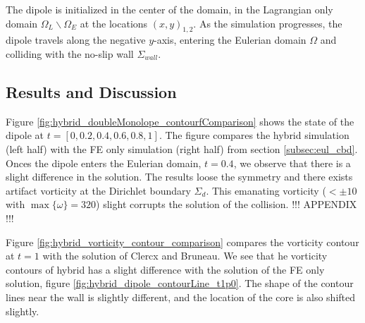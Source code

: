 The dipole is initialized in the center of the domain, in the Lagrangian only domain $\Omega_L\backslash\Omega_E$ at the locations $(x,y)_{1,2}$. As the simulation progresses, the dipole travels along the negative $y$-axis, entering the Eulerian domain $\Omega$ and colliding with the no-slip wall $\Sigma_{wall}$.

\subsection{Results and Discussion}

Figure \ref{fig:hybrid_doubleMonolope_contourfComparison} shows the state of the dipole at $t=[0,0.2,0.4,0.6,0.8,1]$. The figure compares the hybrid simulation (left half) with the FE only simulation (right half) from section \ref{subsec:eul_cbd}. Onces the dipole enters the Eulerian domain, $t=0.4$, we observe that there is a slight difference in the solution. The results loose the symmetry and there exists artifact vorticity at the Dirichlet boundary $\Sigma_d$. This emanating vorticity ($<\pm10$ with $\max\{\omega\}=320$) slight corrupts the solution of the collision. !!! APPENDIX !!!

Figure \ref{fig:hybrid_vorticity_contour_comparison} compares the vorticity contour at $t=1$ with the solution of Clercx and Bruneau. We see that he vorticity contours of hybrid has a slight difference with the solution of the FE only solution, figure \ref{fig:hybrid_dipole_contourLine_t1p0}. The shape of the contour lines near the wall is slightly different, and the location of the core is also shifted slightly.

